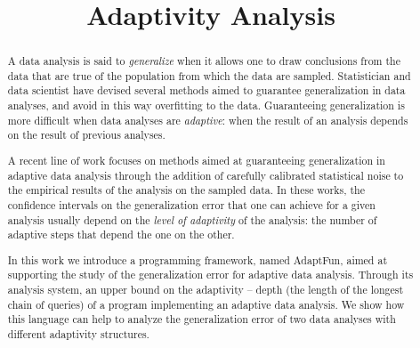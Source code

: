 \documentclass[a4paper,11pt]{article}
\newcommand{\THESYSTEM}{\textsf{AdaptFun}}
\begin{document}
\title{Adaptivity Analysis}

\author{}

\date{}

\maketitle

\begin{abstract}
  A data analysis is said to \emph{generalize} when it allows one to draw
  conclusions from the data that are true of the population from which
  the data are sampled. Statistician and data scientist have devised
  several methods aimed to guarantee generalization in  data
  analyses, and avoid in this way overfitting to the
  data. Guaranteeing generalization is more difficult when data
  analyses are \emph{adaptive}: when the result of an analysis depends
  on the result of previous analyses. 

  A recent line of work focuses on methods aimed at guaranteeing
  generalization in adaptive data analysis through the addition of
  carefully calibrated statistical noise to the empirical results of
  the analysis on the sampled data. In these works, the confidence
  intervals on the generalization error that one can achieve for a
  given analysis usually depend on the \emph{level of adaptivity} of
  the analysis: the number of adaptive steps that depend the one on
  the other. 

  In this work we introduce a programming framework, named \THESYSTEM,  aimed at
  supporting the study of the generalization error for adaptive data
  analysis. Through its analysis system, an upper bound on the adaptivity -- depth (the length of the longest chain of queries) of a program implementing an adaptive data analysis. We show how this language can help to analyze the generalization error of two data analyses with different adaptivity structures.
\end{abstract}

\tableofcontents


\end{document}

